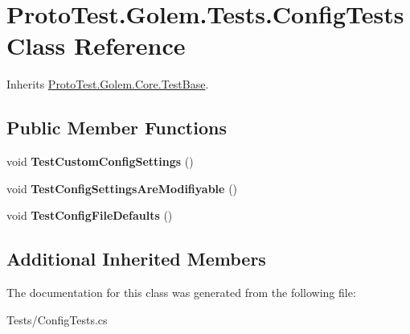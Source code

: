 \hypertarget{class_proto_test_1_1_golem_1_1_tests_1_1_config_tests}{\section{Proto\-Test.\-Golem.\-Tests.\-Config\-Tests Class Reference}
\label{class_proto_test_1_1_golem_1_1_tests_1_1_config_tests}
}


Inherits \hyperlink{class_proto_test_1_1_golem_1_1_core_1_1_test_base}{Proto\-Test.\-Golem.\-Core.\-Test\-Base}.

\subsection*{Public Member Functions}
\begin{DoxyCompactItemize}
\item 
\hypertarget{class_proto_test_1_1_golem_1_1_tests_1_1_config_tests_a54cbe9a276654f9adbee51217339a3bd}{void {\bfseries Test\-Custom\-Config\-Settings} ()}\label{class_proto_test_1_1_golem_1_1_tests_1_1_config_tests_a54cbe9a276654f9adbee51217339a3bd}

\item 
\hypertarget{class_proto_test_1_1_golem_1_1_tests_1_1_config_tests_a6fa44c6975ffcb2a5883ec813958c5e7}{void {\bfseries Test\-Config\-Settings\-Are\-Modifiyable} ()}\label{class_proto_test_1_1_golem_1_1_tests_1_1_config_tests_a6fa44c6975ffcb2a5883ec813958c5e7}

\item 
\hypertarget{class_proto_test_1_1_golem_1_1_tests_1_1_config_tests_a2cf9ef12364c00f4aeb606a476110771}{void {\bfseries Test\-Config\-File\-Defaults} ()}\label{class_proto_test_1_1_golem_1_1_tests_1_1_config_tests_a2cf9ef12364c00f4aeb606a476110771}

\end{DoxyCompactItemize}
\subsection*{Additional Inherited Members}


The documentation for this class was generated from the following file\-:\begin{DoxyCompactItemize}
\item 
Tests/Config\-Tests.\-cs\end{DoxyCompactItemize}
